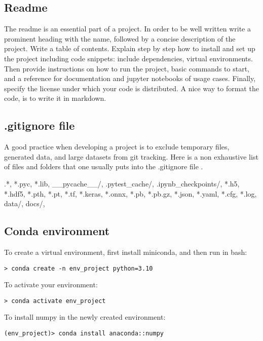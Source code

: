 \documentclass[24pt]{article}
\begin{document}
\subsection{Readme}
 The readme is an essential part of a project. In order to be well written write a prominent heading with the name, followed by a concise description of the project. Write a table of contents. Explain step by step how to install and set up the project including code snippets:  include dependencies, virtual environments. Then provide instructions on how to run the project, basic commands to start, and a reference for documentation and 
 jupyter notebooks of usage cases. Finally, specify the license under which your code is distributed.
A nice way to format the code, is to write it in markdown.


\subsection{.gitignore file}

A good practice when developing a project is to exclude 
temporary files, generated data, and large datasets from git tracking. Here is a non exhaustive list of files and folders that one usually puts into the .gitignore file .

.*,
*.pyc,
*.lib,
\_\_pycache\_\_/,
.pytest\_cache/,
.ipynb\_checkpoints/,
*.h5,
*.hdf5,
*.pth,
*.pt,
*.tf,
*.keras,
*.onnx,
*.pb,
*.pb.gz,
*.json,
*.yaml,
*.cfg,
*.log,
data/,
docs/,

\subsection{Conda environment}
To create a virtual environment, first install miniconda, and then run in bash:

\begin{lstlisting}
> conda create -n env_project python=3.10 
\end{lstlisting}

To activate your environment:

\begin{lstlisting}
> conda activate env_project
\end{lstlisting}

To install numpy in the newly created environment:

\begin{lstlisting}
(env_project)> conda install anaconda::numpy
\end{lstlisting}
\end{document}
